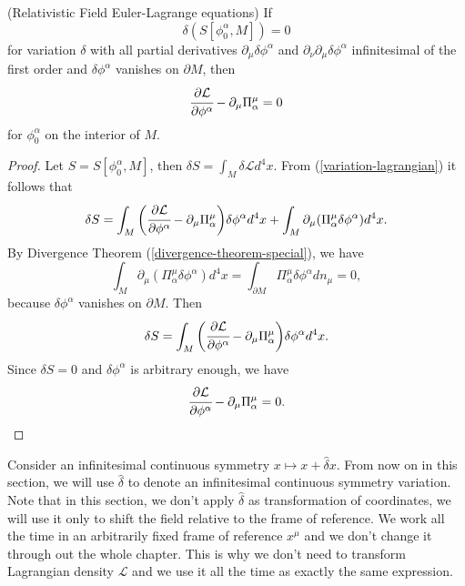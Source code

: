 \documentclass[main.tex]{subfiles}
\begin{document}
\begin{theorem} (Relativistic Field Euler-Lagrange equations) If $${\delta} (S[\phi_0^\alpha, M]) = 0$$ for variation ${\delta}$ with all partial derivatives $\partial_\mu {\delta}\phi^\alpha$ and $\partial_\nu\partial_\mu \delta\phi^\alpha$ infinitesimal of the first order and ${\delta} \phi^\alpha$ vanishes on $\partial M$, then
\begin{equation} 
 \cfrac{\partial \mathcal{L}}{\partial \phi^\alpha} - \partial_\mu \Pi^\mu_\alpha = 0
\end{equation}
for $\phi_0^\alpha$ on the interior of $M$.
\end{theorem}   
\begin{proof}
Let $S = S[\phi_0^\alpha, M]$, then $\delta S = \int_M \delta \mathcal{L} d^4 x$. From (\ref{variation-lagrangian}) it follows that
\begin{equation}
{\delta} S = \int_M \bigg(\cfrac{\partial \mathcal{L}}{\partial \phi^\alpha} - \partial_\mu \Pi^\mu_\alpha \bigg){\delta}\phi^\alpha d^4 x + \int_M\partial_\mu(\Pi^\mu_\alpha {\delta}\phi^\alpha) d^4x.
\end{equation}
By Divergence Theorem (\ref{divergence-theorem-special}), we have
\begin{equation}
\int_M\partial_\mu(\Pi^\mu_\alpha {\delta}\phi^\alpha) d^4x = \int_{\partial M} \Pi^\mu_\alpha {\delta}\phi^\alpha dn_\mu = 0,
\end{equation}
because ${\delta} \phi^\alpha$ vanishes on $\partial M$. Then
\begin{equation}
{\delta} S = \int_M \bigg(\cfrac{\partial \mathcal{L}}{\partial \phi^\alpha} - \partial_\mu \Pi^\mu_\alpha \bigg){\delta}\phi^\alpha d^4 x.
\end{equation}
Since ${\delta} S = 0$ and ${\delta}\phi^\alpha$ is arbitrary enough, we have
\begin{equation}
\cfrac{\partial \mathcal{L}}{\partial \phi^\alpha} - \partial_\mu \Pi^\mu_\alpha = 0.
\end{equation}
\end{proof}

Consider an infinitesimal continuous symmetry $x \mapsto x + \hat{\delta} x$. From now on in this section, we will use $\hat{\delta}$ to denote an infinitesimal continuous symmetry variation. Note that in this section, we don't apply $\hat{\delta}$ as transformation of coordinates, we will use it only to shift the field relative to the frame of reference. We work all the time in an arbitrarily fixed frame of reference $x^\mu$ and we don't change it through out the whole chapter. This is why we don't need to transform Lagrangian density $\mathcal{L}$ and we use it all the time as exactly the same expression.
\end{document}
